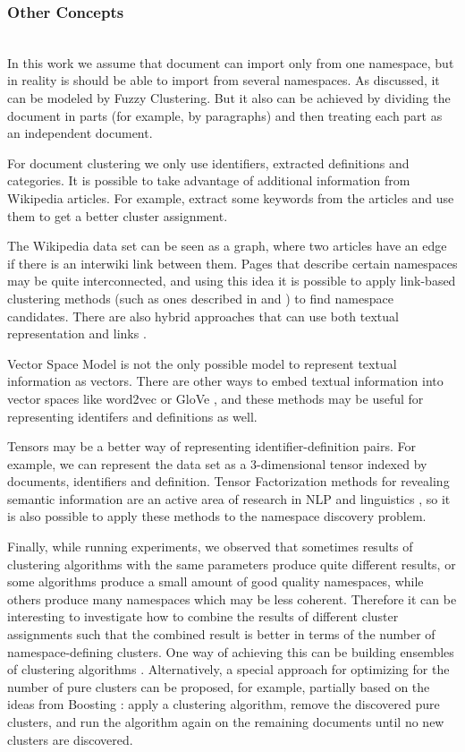 \subsubsection{Other Concepts}  \ \\

In this work we assume that document can import only from one namespace,
but in reality is should be able to import from several namespaces. As discussed,
it can be modeled by Fuzzy Clustering. But it also can be achieved by
dividing the document in parts (for example, by paragraphs)
and then treating each part as an independent document.

For document clustering we only use identifiers, extracted definitions
and categories. It is possible to take advantage of additional information from
Wikipedia articles. For example, extract some keywords from the articles
and use them to get a better cluster assignment.

The Wikipedia data set can be seen as a graph, where two articles have
an edge if there is an interwiki link between them. Pages that describe
certain namespaces may be quite interconnected, and using this idea it is possible
to apply link-based clustering methods (such as ones described in
\cite{botafogo1991identifying} and \cite{johnson1996adaptive}) to find namespace
candidates. There are also hybrid approaches that can use both textual representation
and links \cite{oikonomakou2005review}.

Vector Space Model is not the only possible model to represent textual
information as vectors. There are other ways to embed textual information
into vector spaces like word2vec \cite{mikolov2013efficient} or
GloVe \cite{pennington2014glove}, and these methods may be useful
for representing identifers and definitions as well.

Tensors may be a better way of representing
identifier-definition pairs. For example, we can represent the data set
as a 3-dimensional tensor indexed by documents, identifiers and definition.
Tensor Factorization methods for revealing semantic information
are an active area of research in NLP and linguistics \cite{anisimov2014semantic},
so it is also possible to apply these methods to the namespace discovery problem.

Finally, while running experiments, we observed that sometimes results of
clustering algorithms with the same parameters produce quite different
results, or some algorithms produce a small amount of good quality namespaces,
while others produce many namespaces which may be less coherent.
Therefore it can be interesting to investigate how to combine the results
of different cluster assignments such that the combined result is better
in terms of the number of namespace-defining clusters. One way of
achieving this can be building ensembles of clustering algorithms \cite{strehl2003cluster}.
Alternatively, a special approach for optimizing for the number of pure clusters
can be proposed, for example, partially based on the ideas from
Boosting \cite{freund1996experiments}: apply a clustering algorithm,
remove the discovered pure clusters, and run the algorithm again on the remaining
documents until no new clusters are discovered.


